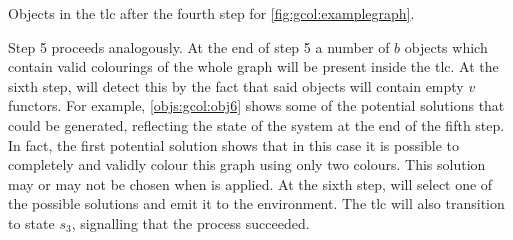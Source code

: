 \begin{cpobjectsfloat}
\begin{cpobjects}
    
    
    
    
    \cpobjectsline{\vdots}
    
    
    
\end{cpobjects}
\caption[Objects in the \gls{tlc} after the fourth step, for \cref{fig:gcol:examplegraph}]{\label{objs:gcol:obj4}Objects in the \gls{tlc} after the fourth step for \cref{fig:gcol:examplegraph}.}
\end{cpobjectsfloat}

Step 5 proceeds analogously.  At the end of step 5 a number of \(b\) objects which contain valid colourings of the whole graph will be present inside the \gls{tlc}.  At the sixth step,  will detect this by the fact that said objects will contain empty \(v\) functors.  For example, \cref{objs:gcol:obj6} shows some of the potential solutions that could be generated, reflecting the state of the system at the end of the fifth step.  In fact, the first potential solution shows that in this case it is possible to completely and validly colour this graph using only two colours.  This solution may or may not be chosen when  is applied.  At the sixth step,  will select one of the possible solutions and emit it to the environment.  The \gls{tlc} will also transition to state \(s_3\), signalling that the process succeeded.

